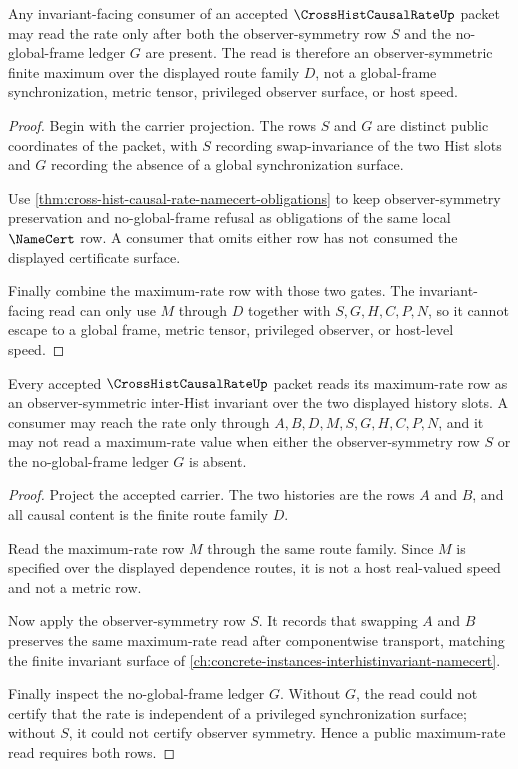 \begin{theorem}
\label{thm:cross-hist-causal-rate-symmetry-nonescape}
Any invariant-facing consumer of an accepted $\CrossHistCausalRateUp$ packet may read the rate only after both the observer-symmetry row $S$ and the no-global-frame ledger $G$ are present. The read is therefore an observer-symmetric finite maximum over the displayed route family $D$, not a global-frame synchronization, metric tensor, privileged observer surface, or host speed.
\end{theorem}
\begin{proof}
Begin with the carrier projection. The rows $S$ and $G$ are distinct public coordinates of the packet, with $S$ recording swap-invariance of the two Hist slots and $G$ recording the absence of a global synchronization surface.

Use \autoref{thm:cross-hist-causal-rate-namecert-obligations} to keep observer-symmetry preservation and no-global-frame refusal as obligations of the same local $\NameCert$ row. A consumer that omits either row has not consumed the displayed certificate surface.

Finally combine the maximum-rate row with those two gates. The invariant-facing read can only use $M$ through $D$ together with $S,G,H,C,P,N$, so it cannot escape to a global frame, metric tensor, privileged observer, or host-level speed.
\end{proof}

\begin{theorem}
\label{thm:cross-hist-causal-rate-invariant-boundary}
Every accepted $\CrossHistCausalRateUp$ packet reads its maximum-rate row as an observer-symmetric inter-Hist invariant over the two displayed history slots. A consumer may reach the rate only through $A,B,D,M,S,G,H,C,P,N$, and it may not read a maximum-rate value when either the observer-symmetry row $S$ or the no-global-frame ledger $G$ is absent.
\end{theorem}
\begin{proof}
Project the accepted carrier. The two histories are the rows $A$ and $B$, and all causal content is the finite route family $D$.

Read the maximum-rate row $M$ through the same route family. Since $M$ is specified over the displayed dependence routes, it is not a host real-valued speed and not a metric row.

Now apply the observer-symmetry row $S$. It records that swapping $A$ and $B$ preserves the same maximum-rate read after componentwise transport, matching the finite invariant surface of \autoref{ch:concrete-instances-interhistinvariant-namecert}.

Finally inspect the no-global-frame ledger $G$. Without $G$, the read could not certify that the rate is independent of a privileged synchronization surface; without $S$, it could not certify observer symmetry. Hence a public maximum-rate read requires both rows.
\end{proof}

